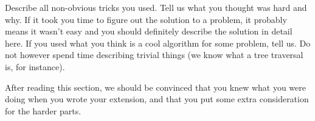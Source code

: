 Describe all non-obvious tricks you used. Tell us what you thought was hard and
why. If it took you time to figure out the solution to a problem, it probably
means it wasn't easy and you should definitely describe the solution in detail
here. If you used what you think is a cool algorithm for some problem, tell us.
Do not however spend time describing trivial things (we know what a tree traversal
is, for instance).

After reading this section, we should be convinced that you knew what you were
doing when you wrote your extension, and that you put some extra consideration
for the harder parts.
